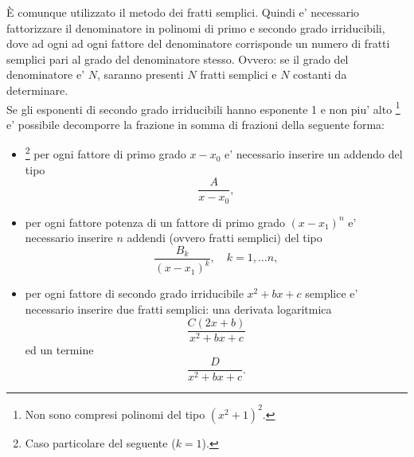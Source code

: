 È comunque utilizzato il metodo dei fratti semplici. Quindi e' necessario fattorizzare il denominatore in polinomi di primo e secondo grado irriducibili, dove ad ogni ad ogni fattore del denominatore corrisponde un numero di fratti semplici pari al grado del denominatore stesso. Ovvero: se il grado del denominatore e' $N$, saranno presenti $N$ fratti semplici e $N$ costanti da determinare.\\
Se gli esponenti di secondo grado irriducibili hanno esponente 1 e non piu' alto \footnote{Non sono compresi polinomi del tipo $(x^2+1)^2$.} e' possibile decomporre la frazione in somma di frazioni della seguente forma:
\begin{itemize}
    \item\footnote{Caso particolare del seguente ($k=1$).} per ogni fattore di primo grado $x-x_0$ e' necessario inserire un addendo del tipo
    \begin{equation*}
        \frac{A}{x-x_0},
    \end{equation*}
    \item per ogni fattore potenza di un fattore di primo grado $(x-x_1)^n$ e' necessario inserire $n$ addendi (ovvero fratti semplici) del tipo
    \begin{equation*}
        \frac{B_k}{(x-x_1)^k},\quad k=1,\hdots n,
    \end{equation*}
    \item per ogni fattore di secondo grado irriducibile $x^2+bx+c$ semplice e' necessario inserire due fratti semplici: una derivata logaritmica
    \begin{equation*}
        \frac{C(2x+b)}{x^2+bx+c}
    \end{equation*}
    ed un termine
    \begin{equation*}
        \frac{D}{x^2+bx+c}.
    \end{equation*}
\end{itemize}
